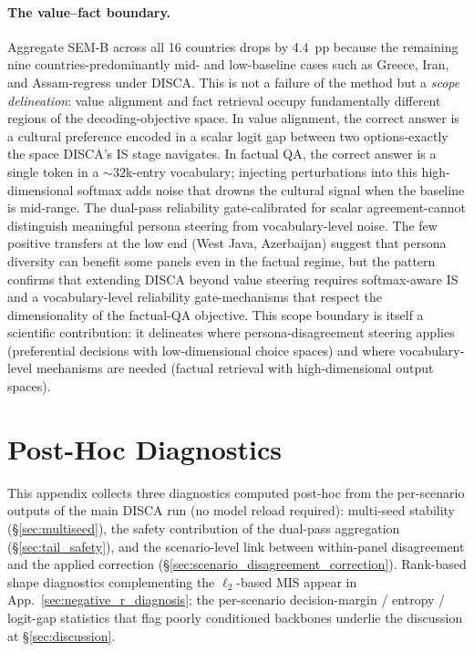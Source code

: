 \documentclass{article}
\begin{document}
\paragraph{The value--fact boundary.}
Aggregate SEM-B across all 16 countries drops by 4.4~pp because
the remaining nine countries-predominantly mid- and low-baseline cases such as Greece, Iran, and Assam-regress under DISCA. This is not a failure of the method but a \emph{scope delineation}: value alignment and fact retrieval occupy fundamentally different regions of the decoding-objective space. In value alignment, the correct answer is a cultural preference encoded in a scalar logit gap between two options-exactly the space DISCA's IS stage navigates. In factual QA, the correct answer is a single token in a ${\sim}\!32$k-entry vocabulary; injecting perturbations into this high-dimensional softmax adds noise that drowns the cultural signal when the baseline is mid-range. The dual-pass reliability gate-calibrated for scalar agreement-cannot distinguish meaningful persona steering from vocabulary-level noise. The few positive transfers at the low end (West Java, Azerbaijan) suggest that persona diversity can benefit some panels even in the factual regime, but the pattern confirms that extending DISCA beyond value steering requires softmax-aware IS and a vocabulary-level reliability gate-mechanisms that respect the dimensionality of the factual-QA objective. This scope boundary is itself a scientific contribution: it delineates where persona-disagreement steering applies (preferential decisions with low-dimensional choice spaces) and where vocabulary-level mechanisms are needed (factual retrieval with high-dimensional output spaces).
\section{Post-Hoc Diagnostics}
\label{app:r2_reliability_audit}
\label{app:r2_logit_conditioning}
\label{app:rank_agreement}

This appendix collects three diagnostics computed post-hoc from the per-scenario outputs of the main DISCA run (no model reload required): multi-seed stability (\S\ref{sec:multiseed}), the safety contribution of the dual-pass aggregation (\S\ref{sec:tail_safety}), and the scenario-level link between within-panel disagreement and the applied correction (\S\ref{sec:scenario_disagreement_correction}). Rank-based shape diagnostics complementing the $\ell_2$-based MIS appear in App.~\ref{sec:negative_r_diagnosis}; the per-scenario decision-margin / entropy / logit-gap statistics that flag poorly conditioned backbones underlie the discussion at \S\ref{sec:discussion}.
\end{document}
